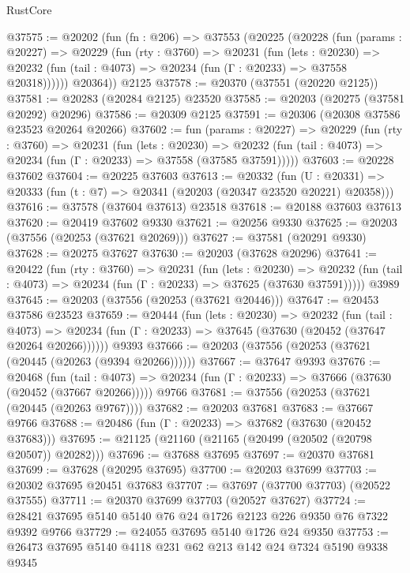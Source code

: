 \begin{lexlean}{RustCore}
\begin{coremodule}
@37575 := @20202
    (fun (fn : @206) =>
    @37553
      (@20225
        (@20228
          (fun (params : @20227) =>
          @20229
            (fun (rty : @3760) =>
            @20231
              (fun (lets : @20230) =>
              @20232 (fun (tail : @4073) => @20234 (fun (Γ : @20233) => @37558 @20318))))))
        @20364))
    @2125
@37578 := @20370 (@37551 (@20220 @2125))
@37581 := @20283 (@20284 @2125) @23520
@37585 := @20203 (@20275 (@37581 @20292) @20296)
@37586 := @20309 @2125
@37591 := @20306 (@20308 @37586 @23523 @20264 @20266)
@37602 := fun (params : @20227) =>
  @20229
    (fun (rty : @3760) =>
    @20231
      (fun (lets : @20230) =>
      @20232 (fun (tail : @4073) => @20234 (fun (Γ : @20233) => @37558 (@37585 @37591)))))
@37603 := @20228 @37602
@37604 := @20225 @37603
@37613 := @20332
    (fun (U : @20331) => @20333 (fun (t : @7) => @20341 (@20203 (@20347 @23520 @20221) @20358)))
@37616 := @37578 (@37604 @37613) @23518
@37618 := @20188 @37603 @37613
@37620 := @20419 @37602 @9330
@37621 := @20256 @9330
@37625 := @20203 (@37556 (@20253 (@37621 @20269)))
@37627 := @37581 (@20291 @9330)
@37628 := @20275 @37627
@37630 := @20203 (@37628 @20296)
@37641 := @20422
    (fun (rty : @3760) =>
    @20231
      (fun (lets : @20230) =>
      @20232 (fun (tail : @4073) => @20234 (fun (Γ : @20233) => @37625 (@37630 @37591)))))
    @3989
@37645 := @20203 (@37556 (@20253 (@37621 @20446)))
@37647 := @20453 @37586 @23523
@37659 := @20444
    (fun (lets : @20230) =>
    @20232
      (fun (tail : @4073) =>
      @20234 (fun (Γ : @20233) => @37645 (@37630 (@20452 (@37647 @20264 @20266))))))
    @9393
@37666 := @20203 (@37556 (@20253 (@37621 (@20445 (@20263 (@9394 @20266))))))
@37667 := @37647 @9393
@37676 := @20468
    (fun (tail : @4073) => @20234 (fun (Γ : @20233) => @37666 (@37630 (@20452 (@37667 @20266)))))
    @9766
@37681 := @37556 (@20253 (@37621 (@20445 (@20263 @9767))))
@37682 := @20203 @37681
@37683 := @37667 @9766
@37688 := @20486 (fun (Γ : @20233) => @37682 (@37630 (@20452 @37683)))
@37695 := @21125 (@21160 (@21165 (@20499 (@20502 (@20798 @20507)) @20282)))
@37696 := @37688 @37695
@37697 := @20370 @37681
@37699 := @37628 (@20295 @37695)
@37700 := @20203 @37699
@37703 := @20302 @37695 @20451 @37683
@37707 := @37697 (@37700 @37703) (@20522 @37555)
@37711 := @20370 @37699 @37703 (@20527 @37627)
@37724 := @28421 @37695 @5140 @5140 @76 @24 @1726 @2123 @226 @9350 @76 @7322 @9392 @9766
@37729 := @24055 @37695 @5140 @1726 @24 @9350
@37753 := @26473
    @37695
    @5140
    @4118
    @231
    @62
    @213
    @142
    @24
    @7324
    @5190
    @9338
    @9345

\end{coremodule}
\end{lexlean}
